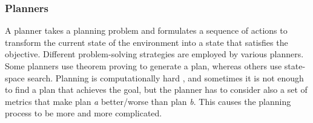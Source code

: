 \subsubsection{Planners}

A planner takes a planning problem and formulates a sequence of actions 
to transform the current state of the environment into a state 
that satisfies the objective. Different problem-solving 
strategies are employed by various planners. 
Some planners use theorem proving \cite{PlanningSatisfiabilitykautz1992} 
to generate a plan, whereas others use state-space search. 
Planning is computationally hard 
\cite{ComplexityDecidabilityUndecidabilityerol1995}, and 
sometimes it is not enough to find a plan that achieves the goal, 
but the planner has to consider also a set of metrics that make plan 
\textit{a} better/worse than plan \textit{b}. 
This causes the planning process to be more and more complicated.

